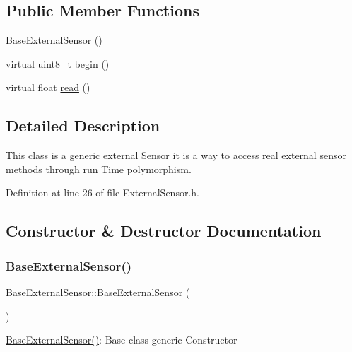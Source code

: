 \subsection*{Public Member Functions}
\begin{DoxyCompactItemize}
\item 
\hyperlink{class_base_external_sensor_a978d96a6563b646efb358c2790a9fc6f}{Base\+External\+Sensor} ()
\item 
virtual uint8\+\_\+t \hyperlink{class_base_external_sensor_a87d132803d4f4fdd4e66332809f0c9a0}{begin} ()
\item 
virtual float \hyperlink{class_base_external_sensor_a1564f16deacf57b51b9948ac29db4291}{read} ()
\end{DoxyCompactItemize}


\subsection{Detailed Description}
This class is a generic external Sensor it is a way to access real external sensor methods through run Time polymorphism. 

Definition at line 26 of file External\+Sensor.\+h.



\subsection{Constructor \& Destructor Documentation}
\mbox{\label{class_base_external_sensor_a978d96a6563b646efb358c2790a9fc6f}} 
\subsubsection{\texorpdfstring{Base\+External\+Sensor()}{BaseExternalSensor()}}
{\footnotesize\ttfamily Base\+External\+Sensor\+::\+Base\+External\+Sensor (\begin{DoxyParamCaption}{ }\end{DoxyParamCaption})\hspace{0.3cm}{\ttfamily [inline]}}

\hyperlink{class_base_external_sensor_a978d96a6563b646efb358c2790a9fc6f}{Base\+External\+Sensor()}\+: Base class generic Constructor 

